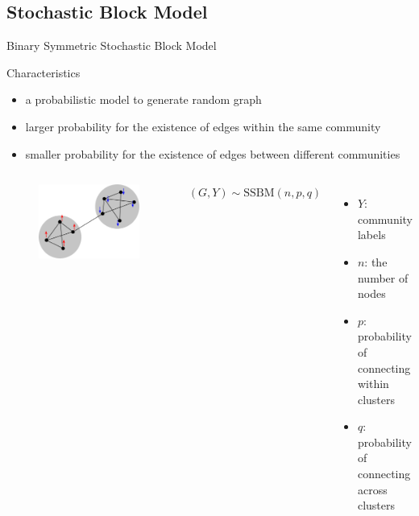 \documentclass[notheorems]{beamer}
\begin{document}
\subsection{Stochastic Block Model}
\begin{frame}{Binary Symmetric Stochastic Block Model}
	\begin{block}{Characteristics}
		\begin{itemize}
		\item a probabilistic model to generate random graph
		\item larger probability for the existence of edges within the same community
		\item smaller probability for the existence of edges between different communities
		\end{itemize}
		\end{block}
		\begin{columns}
				\begin{figure}
				\includegraphics[width=\textwidth]{sbm.png}
			\end{figure}
		\quad$(G,Y)\sim \textrm{SSBM}(n, p, q)$
		\begin{itemize}
			\item $Y$: community labels
			\item $n$: the number of nodes
			\item $p$: probability of connecting within clusters
			\item $q$: probability of connecting across clusters
		\end{itemize}
		\end{columns}	
\end{frame}
\end{document}
